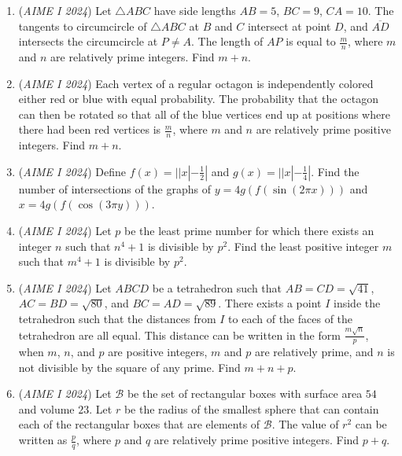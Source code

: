 \begin{enumerate}
 

	\item (\textit{AIME I 2024}) Let $\triangle ABC$ have side lengths $AB=5$, $BC=9$, $CA=10$. The tangents to circumcircle of $\triangle ABC$ at $B$ and $C$ intersect at point $D$, and $\overline{AD}$ intersects the circumcircle at $P \neq A$. The length of $AP$ is equal to $\frac{m}{n}$, where $m$ and $n$ are relatively prime integers. Find $m + n$.


 

	\item (\textit{AIME I 2024}) Each vertex of a regular octagon is independently colored either red or blue with equal probability. The probability that the octagon can then be rotated so that all of the blue vertices end up at positions where there had been red vertices is $\frac{m}{n}$, where $m$ and $n$ are relatively prime positive integers. Find $m+n$.


 

	\item (\textit{AIME I 2024}) Define $f(x)=|| x|-\frac{1}{2}|$ and $g(x)=|| x|-\frac{1}{4}|$. Find the number of intersections of the graphs of $y=4g(f(\sin (2 \pi x)))$ and $x=4g(f(\cos (3 \pi y)))$.


 

	\item (\textit{AIME I 2024}) Let $p$ be the least prime number for which there exists an integer $n$ such that $n^{4}+1$ is divisible by $p^{2}$. Find the least positive integer $m$ such that $m^{4}+1$ is divisible by $p^{2}$.


 

	\item (\textit{AIME I 2024}) Let $ABCD$ be a tetrahedron such that $AB = CD = \sqrt{41}$, $AC = BD = \sqrt{80}$, and $BC = AD = \sqrt{89}$. There exists a point $I$ inside the tetrahedron such that the distances from $I$ to each of the faces of the tetrahedron are all equal. This distance can be written in the form $\frac{m \sqrt{n}}{p}$, when $m$, $n$, and $p$ are positive integers, $m$ and $p$ are relatively prime, and $n$ is not divisible by the square of any prime. Find $m+n+p$.


 

	\item (\textit{AIME I 2024}) Let $\mathcal{B}$ be the set of rectangular boxes with surface area $54$ and volume $23$. Let $r$ be the radius of the smallest sphere that can contain each of the rectangular boxes that are elements of $\mathcal{B}$. The value of $r^2$ can be written as $\frac{p}{q}$, where $p$ and $q$ are relatively prime positive integers. Find $p+q$.


 

\end{enumerate}